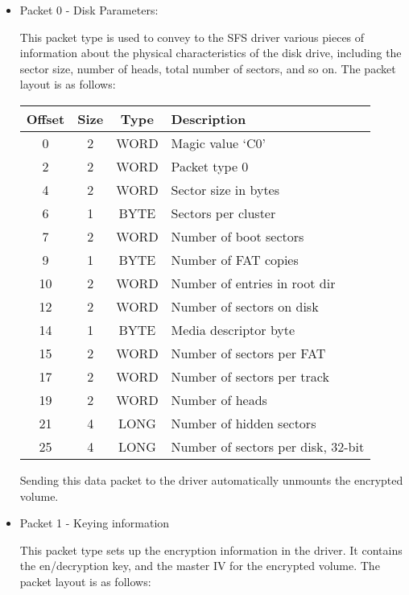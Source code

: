 \begin{itemize}
\item Packet 0 - Disk Parameters:

This packet type is used to convey to the SFS driver various pieces of
information about the physical characteristics of the disk drive, including the
sector size, number of heads, total number of sectors, and so on.  The packet
layout is as follows:

\begin{center}
\begin{tabular}{|c|c|c|l|}
\hline
    Offset & Size &   Type    &    Description\\
\hline
       0   &   2  &   WORD    &    Magic value `C0'\\
       2   &   2  &   WORD    &    Packet type 0\\
       4   &   2  &   WORD    &    Sector size in bytes\\
       6   &   1  &   BYTE    &    Sectors per cluster\\
       7   &   2  &   WORD    &    Number of boot sectors\\
       9   &   1  &   BYTE    &    Number of FAT copies\\
      10   &   2  &   WORD    &    Number of entries in root dir\\
      12   &   2  &   WORD    &    Number of sectors on disk\\
      14   &   1  &   BYTE    &    Media descriptor byte\\
      15   &   2  &   WORD    &    Number of sectors per FAT\\
      17   &   2  &   WORD    &    Number of sectors per track\\
      19   &   2  &   WORD    &    Number of heads\\
      21   &   4  &   LONG    &    Number of hidden sectors\\
      25   &   4  &   LONG    &    Number of sectors per disk, 32-bit\\
\hline
\end{tabular}
\end{center}

Sending this data packet to the driver automatically unmounts the encrypted
volume.


\item Packet 1 - Keying information

This packet type sets up the encryption information in the driver.  It contains
the en/decryption key, and the master IV for the encrypted volume.  The packet
layout is as follows:


\end{itemize}
